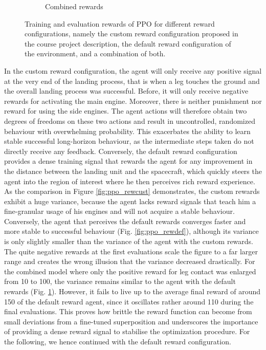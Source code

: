 \documentclass[a4paper, 11pt]{article}
\begin{document}
\begin{figure}[H]
\begin{center}
\begin{subfigure}{0.48\textwidth}
		\caption{Combined rewards}
		\label{fig:ppo_rewcomb}
		\end{subfigure}
	\end{center}
		\caption{Training and evaluation rewards of PPO for different reward configurations, namely the custom reward configuration proposed in the course project description, the default reward configuration of the environment, and a combination of both.}
		\label{fig:ppo_reward}
	\end{figure}
	In the custom reward configuration, the agent will only receive any positive signal at the very end of the landing process, that is when a leg touches the ground and the overall landing process was successful. Before, it will only receive negative rewards for activating the main engine. Moreover, there is neither punishment nor reward for using the side engines. The agent actions will therefore obtain two degrees of freedoms on these two actions and result in uncontrolled, randomized behaviour with overwhelming probability.
	This exacerbates the ability to learn stable successful long-horizon behaviour, as the intermediate steps taken do not directly receive any feedback. Conversely, the default reward configuration provides a dense training signal that rewards the agent for any improvement in the distance between the landing unit and the spacecraft, which quickly steers the agent into the region of interest where he then perceives rich reward experience. As the comparison in Figure \ref{fig:ppo_rewcust} demonstrates, the custom rewards exhibit a huge variance, because the agent lacks reward signals that teach him a fine-granular usage of his engines and will not acquire a stable behaviour. Conversely, the agent that perceives the default rewards converges faster and more stable to successful behaviour (Fig. \ref{fig:ppo_rewdef}), although its variance is only slightly smaller than the variance of the agent with the custom rewards. The quite negative rewards at the first evaluations scale the figure to a far larger range and creates the wrong illusion that the variance decreased drastically. For the combined model where only the positive reward for leg contact was enlarged from 10 to 100, the variance remains similar to the agent with the default rewards (Fig. \ref{fig:ppo_rewcomb}). However, it fails to live up to the average final reward of around 150 of the default reward agent, since it oscillates rather around 110 during the final evaluations. This proves how brittle the reward function can become from small deviations from a fine-tuned superposition and underscores the importance of providing a dense reward signal to stabilise the optimization procedure.
	For the following, we hence continued with the default reward configuration.
	
\end{document}
